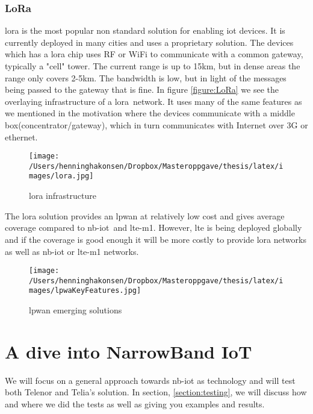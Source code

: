 \documentclass[USenglish]{ifimaster}  %
\begin{document}
\subsection{LoRa \cite{online:LoRa}}
\acrshort{lora} is the most popular non standard solution for enabling \acrshort{iot} devices. It is currently deployed in many cities and uses a proprietary solution. The devices which has a \acrshort{lora} chip uses RF or WiFi to communicate with a common gateway, typically a "cell" tower. The current range is up to 15km, but in dense areas the range only covers 2-5km. The bandwidth is low, but in light of the messages being passed to the gateway that is fine. In figure \vref{figure:LoRa} we see the overlaying infrastructure of a \acrshort{lora} network. It uses many of the same features as we mentioned in the motivation where the devices communicate with a middle box(concentrator/gateway), which in turn communicates with Internet over 3G or ethernet.

\begin{figure}[ht]
  \centering\texttt{[image: /Users/henninghakonsen/Dropbox/Masteroppgave/thesis/latex/images/lora.jpg]}
  \caption{\acrshort{lora} infrastructure \cite{online:LoRa}}
  \label{figure:LoRa}
\end{figure}

The \acrshort{lora} solution provides an \acrshort{lpwan} at relatively low cost and gives average coverage compared to \acrshort{nb-iot} and \acrshort{lte-m1}. However, \acrshort{lte} is being deployed globally and if the coverage is good enough it will be more costly to provide \acrshort{lora} networks as well as \acrshort{nb-iot} or \acrshort{lte-m1} networks.

\begin{figure}[ht]
  \centering\texttt{[image: /Users/henninghakonsen/Dropbox/Masteroppgave/thesis/latex/images/lpwaKeyFeatures.jpg]}
  \caption{\acrshort{lpwan} emerging solutions \cite{online:legacyWire}}
  \label{figure:legacyWire}
\end{figure}

\chapter{A dive into NarrowBand IoT} \label{section:nb-iot}
We will focus on a general approach towards \acrshort{nb-iot} as technology and will test both Telenor and Telia's solution. In section, \vref{section:testing}, we will discuss how and where we did the tests as well as giving you examples and results.
\end{document}
